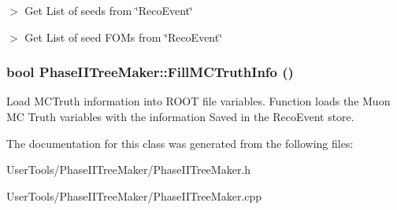 $>$ Get List of seeds from \char`\"{}RecoEvent\char`\"{}

$>$ Get List of seed FOMs from \char`\"{}RecoEvent\char`\"{} \hypertarget{classPhaseIITreeMaker_ac2d2d03c44f7abcafce90ea1c0f2b935}{
\subsubsection[{FillMCTruthInfo}]{\setlength{\rightskip}{0pt plus 5cm}bool PhaseIITreeMaker::FillMCTruthInfo ()}}
\label{classPhaseIITreeMaker_ac2d2d03c44f7abcafce90ea1c0f2b935}


Load MCTruth information into ROOT file variables. Function loads the Muon MC Truth variables with the information Saved in the RecoEvent store. 

The documentation for this class was generated from the following files:\begin{DoxyCompactItemize}
\item 
UserTools/PhaseIITreeMaker/PhaseIITreeMaker.h\item 
UserTools/PhaseIITreeMaker/PhaseIITreeMaker.cpp\end{DoxyCompactItemize}
